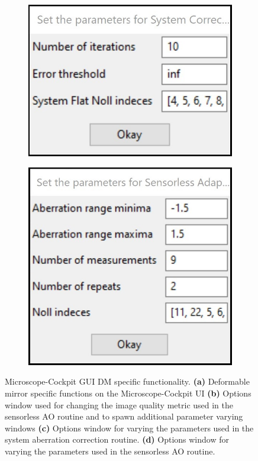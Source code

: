 \begin{figure}
	\begin{subfigure}{0.45\textwidth}
		\centering
		\includegraphics[width=\linewidth]{images/direct_wavefront_sensing_options.jpg}
		\caption{}
		\label{fig:DM_direct_wavefront_sensing_options}
	\end{subfigure}
	\begin{subfigure}{0.35\textwidth}
		\centering
		\includegraphics[width=\linewidth]{images/sensorless_ao_parameters.jpg}
		\caption{}
		\label{fig:DM_sensorless_ao_parameters}
	\end{subfigure}
	\caption[Microscope-Cockpit GUI DM specific functionality]{Microscope-Cockpit GUI DM specific functionality. \textbf{(a)} Deformable mirror specific functions on the Microscope-Cockpit UI \textbf{(b)} Options window used for changing the image quality metric used in the sensorless AO routine and to spawn additional parameter varying windows \textbf{(c)} Options window for varying the parameters used in the system aberration correction routine. \textbf{(d)} Options window for varying the parameters used in the sensorless AO routine.}
	\label{fig:DeepSIM_control_software}
\end{figure}

